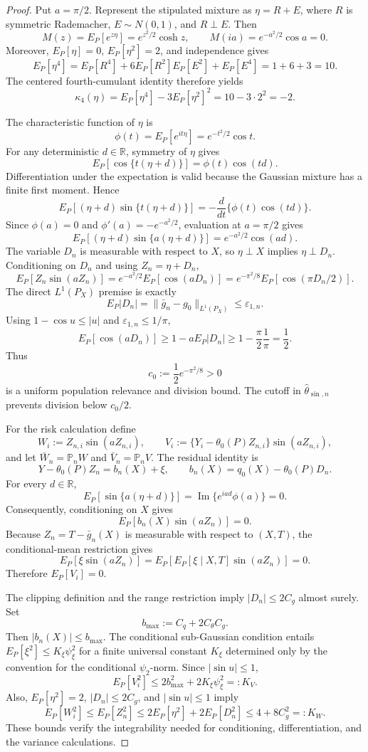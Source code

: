 \documentclass{article}
\begin{document}
\begin{proof}
Put \(a=\pi/2\). Represent the stipulated mixture as \(\eta=R+E\), where \(R\) is symmetric Rademacher, \(E\sim N(0,1)\), and \(R\perp E\). Then
\[
M(z)=E_P[e^{z\eta}]=e^{z^2/2}\cosh z,
\qquad
M(ia)=e^{-a^2/2}\cos a=0.
\]
Moreover, \(E_P[\eta]=0\), \(E_P[\eta^2]=2\), and independence gives
\[
E_P[\eta^4]
=E_P[R^4]+6E_P[R^2]E_P[E^2]+E_P[E^4]
=1+6+3=10.
\]
The centered fourth-cumulant identity therefore yields
\[
\kappa_4(\eta)=E_P[\eta^4]-3E_P[\eta^2]^2=10-3\cdot2^2=-2.
\]

The characteristic function of \(\eta\) is
\[
\phi(t)=E_P[e^{it\eta}]=e^{-t^2/2}\cos t.
\]
For any deterministic \(d\in\mathbb R\), symmetry of \(\eta\) gives
\[
E_P[\cos\{t(\eta+d)\}]=\phi(t)\cos(td).
\]
Differentiation under the expectation is valid because the Gaussian mixture has a finite first moment. Hence
\[
E_P[(\eta+d)\sin\{t(\eta+d)\}]
=-\frac{d}{dt}\{\phi(t)\cos(td)\}.
\]
Since \(\phi(a)=0\) and \(\phi'(a)=-e^{-a^2/2}\), evaluation at \(a=\pi/2\) gives
\[
E_P[(\eta+d)\sin\{a(\eta+d)\}]
=e^{-a^2/2}\cos(ad).
\]
The variable \(D_n\) is measurable with respect to \(X\), so \(\eta\perp X\) implies \(\eta\perp D_n\). Conditioning on \(D_n\) and using \(Z_n=\eta+D_n\),
\[
E_P[Z_n\sin(aZ_n)]
=e^{-a^2/2}E_P[\cos(aD_n)]
=e^{-\pi^2/8}E_P[\cos(\pi D_n/2)].
\]
The direct \(L^1(P_X)\) premise is exactly
\[
E_P|D_n|=\|\bar g_n-g_0\|_{L^1(P_X)}\le\varepsilon_{1,n}.
\]
Using \(1-\cos u\le |u|\) and \(\varepsilon_{1,n}\le1/\pi\),
\[
E_P[\cos(aD_n)]
\ge1-aE_P|D_n|
\ge1-\frac{\pi}{2}\frac1\pi
=\frac12.
\]
Thus
\[
c_0:=\frac12e^{-\pi^2/8}>0
\]
is a uniform population relevance and division bound. The cutoff in \(\widehat\theta_{\sin,n}\) prevents division below \(c_0/2\).

For the risk calculation define
\[
W_i:=Z_{n,i}\sin(aZ_{n,i}),
\qquad
V_i:=\{Y_i-\theta_0(P)Z_{n,i}\}\sin(aZ_{n,i}),
\]
and let \(\bar W_n=\mathbb P_nW\) and \(\bar V_n=\mathbb P_nV\). The residual identity is
\[
Y-\theta_0(P)Z_n=b_n(X)+\xi,
\qquad
b_n(X)=q_0(X)-\theta_0(P)D_n.
\]
For every \(d\in\mathbb R\),
\[
E_P[\sin\{a(\eta+d)\}]
=\operatorname{Im}\{e^{iad}\phi(a)\}=0.
\]
Consequently, conditioning on \(X\) gives
\[
E_P[b_n(X)\sin(aZ_n)]=0.
\]
Because \(Z_n=T-\bar g_n(X)\) is measurable with respect to \((X,T)\), the conditional-mean restriction gives
\[
E_P[\xi\sin(aZ_n)]
=E_P\!\left[E_P[\xi\mid X,T]\sin(aZ_n)\right]=0.
\]
Therefore \(E_P[V_i]=0\).

The clipping definition and the range restriction imply \(|D_n|\le2C_g\) almost surely. Set
\[
b_{\max}:=C_q+2C_{\theta}C_g.
\]
Then \(|b_n(X)|\le b_{\max}\). The conditional sub-Gaussian condition entails \(E_P[\xi^2]\le K_{\xi}\psi_{\xi}^2\) for a finite universal constant \(K_{\xi}\) determined only by the convention for the conditional \(\psi_2\)-norm. Since \(|\sin u|\le1\),
\[
E_P[V_i^2]
\le2b_{\max}^2+2K_{\xi}\psi_{\xi}^2
=:K_V.
\]
Also, \(E_P[\eta^2]=2\), \(|D_n|\le2C_g\), and \(|\sin u|\le1\) imply
\[
E_P[W_i^2]
\le E_P[Z_n^2]
\le2E_P[\eta^2]+2E_P[D_n^2]
\le4+8C_g^2
=:K_W.
\]
These bounds verify the integrability needed for conditioning, differentiation, and the variance calculations.


\end{proof}
\end{document}
